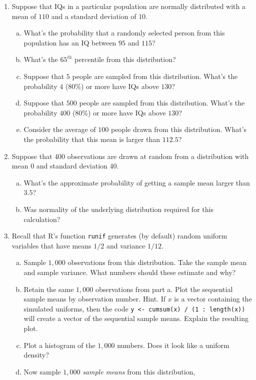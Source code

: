 \documentclass[12pt]{article}
\begin{document}
\begin{enumerate}[Problem 1.]
\item  Suppose that IQs in a particular population are normally
  distributed with a mean of $110$ and a standard deviation of $10$.
  \begin{enumerate}[a.]
  \item What's the probability that a randomly selected person from
    this population has an IQ between $95$ and $115$?
  \item What's the $65^{th}$ percentile from this distribution?
  \item Suppose that $5$ people are sampled from this distribution.
    What's the probability $4$ (80\%) or more have IQs above $130$?
  \item Suppose that $500$ people are sampled from this distribution.
    What's the probability $400$ (80\%) or more have IQs above $130$?
  \item Consider the average of $100$ people drawn from this
    distribution. What's the probability that this mean is larger
    than $112.5$?
  \end{enumerate}
\item  Suppose that $400$ observations are drawn at random
  from a distribution with mean $0$ and standard deviation $40$.
  \begin{enumerate}[a.]
  \item What's the approximate probability of getting a sample mean larger
    than $3.5$?
  \item Was normality of the underlying distribution required for this
    calculation?
  \end{enumerate}
\item Recall that R's function \texttt{runif} generates (by default)
  random uniform variables that have means $1/2$ and variance $1/12$.
  \begin{enumerate}[a.]
  \item Sample $1,000$ observations from this distribution. Take the
    sample mean and sample variance. What numbers should these
    estimate and why?
  \item Retain the same $1,000$ observations from part a. Plot the
    sequential sample means by observation number. Hint. If $x$ is a
    vector containing the simulated uniforms, then the code \texttt{y
      <- cumsum(x) / (1 : length(x))} will create a vector of the
    sequential sample means. Explain the resulting plot.
  \item Plot a histogram of the $1,000$ numbers. Does it look like a
    uniform density?
  \item Now sample $1,000$ {\em sample means} from this distribution,

\end{enumerate}
\end{enumerate}
\end{document}
